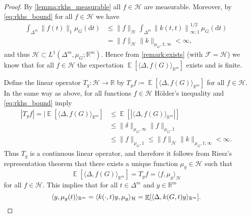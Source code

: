 \documentclass{article}
\DeclareMathOperator{\Expect}{\mathbb{E}}
\begin{document}
\begin{proof}
  By \cref{lemma:rkhs_measurable} all $f \in \mathcal{H}$ are measurable.
  Moreover, by \cref{eq:rkhs_bound} for all $f \in \mathcal{H}$ we have
  \begin{equation*}
    \begin{split}
      \int_{\Delta^m} \|f(t)\|_1 \mu_G(\mathrm{d}t) &\leq \|f\|_{\mathcal{H}} \int_{\Delta^m} {\|k(t,t)\|}_{\infty;1}^{1/2} \,\mu_G(\mathrm{d}t) \\
      &= \|f\|_{\mathcal{H}} \|k\|_{\mu_G,1;\infty} < \infty,
    \end{split}
  \end{equation*}
  and thus $\mathcal{H} \subset L^1(\Delta^m, \mu_G; \mathbb{R}^m)$. Hence from
  \cref{remark:exists} (with $\mathcal{F} = \mathcal{H}$) we know that for all
  $f \in \mathcal{H}$ the expectation
  $\Expect[\langle \Delta, f(G)\rangle_{\mathbb{R}^m}]$ exists and is finite.

  Define the linear operator $T_g \colon \mathcal{H} \to \mathbb{R}$ by
  $T_gf \coloneqq \Expect[\langle \Delta, f(G)\rangle_{\mathbb{R}^m}]$ for all
  $f \in \mathcal{H}$. In the same way as above, for all functions
  $f \in \mathcal{H}$ Hölder's inequality and \cref{eq:rkhs_bound} imply
  \begin{equation*}
    \begin{split}
      |T_gf| = |\Expect[\langle \Delta, f(G) \rangle_{\mathbb{R}^m}] &\leq \Expect[|\langle \Delta, f(G) \rangle_{\mathbb{R}^m}|] \\
      &\leq \|\delta\|_{\mu_G,\infty} \|f\|_{\mu_G,1} \\
      &\leq \|f\|_{\mu_G,1} \leq \|f\|_{\mathcal{H}} \|k\|_{\mu_G,1;\infty} < \infty.
    \end{split}
  \end{equation*}
  Thus $T_g$ is a continuous linear operator, and therefore it follows from
  Riesz's representation theorem that there exists a unique function
  $\mu_g \in \mathcal{H}$ such that
  \begin{equation*}
    \Expect[\langle \Delta, f(G)\rangle_{\mathbb{R}^m}] = T_g f = \langle f, \mu_g \rangle_{\mathcal{H}}
  \end{equation*}
  for all $f \in \mathcal{H}$. This implies that for all $t \in \Delta^m$ and
  $y \in \mathbb{R}^m$
  \begin{equation*}
    \langle y, \mu_g(t) \rangle_{\mathbb{R}^m} = \langle k(\cdot, t) y, \mu_g \rangle_{\mathcal{H}} = \Expect[\langle \Delta, k(G, t) y \rangle_{\mathbb{R}^m}]. \qedhere
  \end{equation*}
\end{proof}
\end{document}
